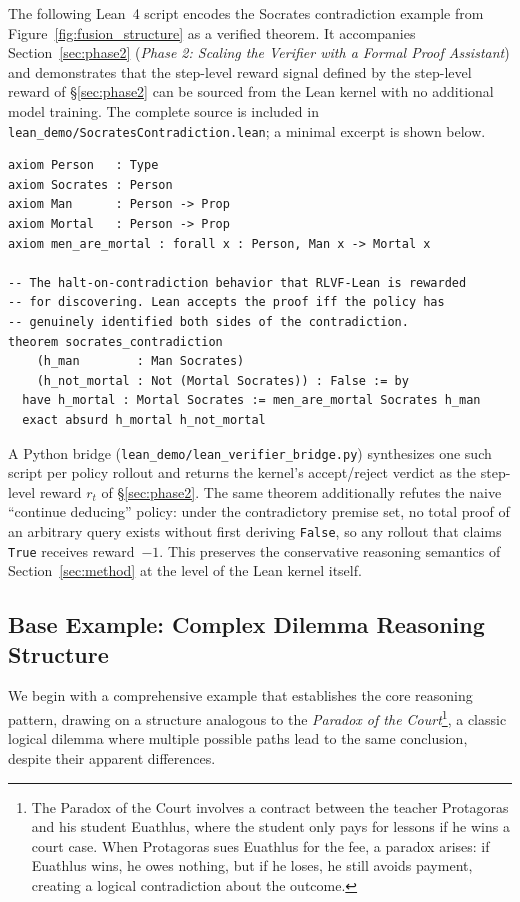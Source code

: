 \documentclass{article}
\begin{document}
The following Lean~4 script encodes the Socrates contradiction example from
Figure~\ref{fig:fusion_structure} as a verified theorem. It accompanies
Section~\ref{sec:phase2} (\emph{Phase 2: Scaling the Verifier with a Formal
Proof Assistant}) and demonstrates that the step-level reward signal defined
by the step-level reward of \S\ref{sec:phase2} can be sourced from the Lean kernel with no
additional model training. The complete source is included in
\texttt{lean\_demo/SocratesContradiction.lean}; a minimal excerpt is shown
below.

\begin{verbatim}
axiom Person   : Type
axiom Socrates : Person
axiom Man      : Person -> Prop
axiom Mortal   : Person -> Prop
axiom men_are_mortal : forall x : Person, Man x -> Mortal x

-- The halt-on-contradiction behavior that RLVF-Lean is rewarded
-- for discovering. Lean accepts the proof iff the policy has
-- genuinely identified both sides of the contradiction.
theorem socrates_contradiction
    (h_man        : Man Socrates)
    (h_not_mortal : Not (Mortal Socrates)) : False := by
  have h_mortal : Mortal Socrates := men_are_mortal Socrates h_man
  exact absurd h_mortal h_not_mortal
\end{verbatim}

A Python bridge (\texttt{lean\_demo/lean\_verifier\_bridge.py}) synthesizes
one such script per policy rollout and returns the kernel's accept/reject
verdict as the step-level reward $r_t$ of \S\ref{sec:phase2}. The
same theorem additionally refutes the naive ``continue deducing'' policy:
under the contradictory premise set, no total proof of an arbitrary query
exists without first deriving \texttt{False}, so any rollout that claims
\texttt{True} receives reward~$-1$. This preserves the conservative
reasoning semantics of Section~\ref{sec:method} at the level of the Lean
kernel itself.

\subsection{Base Example: Complex Dilemma Reasoning Structure}
\label{app:base-example}
We begin with a comprehensive example that establishes the core reasoning pattern, drawing on a structure analogous to the \textit{Paradox of the Court}\footnote{The Paradox of the Court involves a contract between the teacher Protagoras and his student Euathlus, where the student only pays for lessons if he wins a court case. When Protagoras sues Euathlus for the fee, a paradox arises: if Euathlus wins, he owes nothing, but if he loses, he still avoids payment, creating a logical contradiction about the outcome.}, a classic logical dilemma where multiple possible paths lead to the same conclusion, despite their apparent differences.
\end{document}
